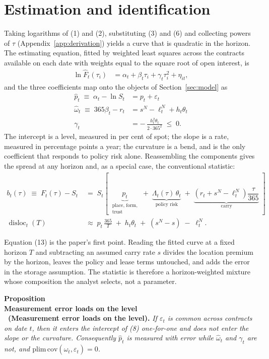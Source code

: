 \documentclass[11pt,a4paper]{article}
\newcounter{proposition}
\newenvironment{proposition}[1][]
  {\par\refstepcounter{proposition}\medskip\noindent
   \textbf{Proposition \theproposition\ifx\\#1\\\else\ (#1)\fi.}\itshape\space}
  {\upshape\par\medskip}
\newcommand{\sN}{s^{N}}
\newcommand{\lN}{\ell^{N}_{t}}
\newcommand{\Fhat}{\widehat{F}}
\newcommand{\disloc}{\operatorname{disloc}}
\begin{document}
\section{Estimation and identification}
\label{sec:ident}

Taking logarithms of (1) and (2), substituting (3) and (6) and collecting powers
of $\tau$ (Appendix~\ref{app:derivation}) yields a curve that is quadratic in
the horizon. The estimating equation, fitted by weighted least squares across
the contracts available on each date with weights equal to the square root of
open interest, is
\begin{align}
\ln \Fhat_t(\tau_i) &= \alpha_t+\beta_t\tau_i+\gamma_t\tau_i^{2}+\eta_{it},
\end{align}
and the three coefficients map onto the objects of Section~\ref{sec:model} as
\begin{align}
\hat{p}_t \;\equiv\; \alpha_t-\ln S_t &= p_t+\varepsilon_t \\[2pt]
\hat{\omega}_t \;\equiv\; 365\beta_t-r_t &= \sN-\lN+h_t\theta_t \\[2pt]
\gamma_t &= -\,\frac{h_t^{2}\theta_t}{2\cdot 365^{2}} \;\le\; 0 .
\end{align}
The intercept is a level, measured in per cent of spot; the slope is a rate,
measured in percentage points a year; the curvature is a bend, and is the only
coefficient that responds to policy risk alone. Reassembling the components
gives the spread at any horizon and, as a special case, the conventional
statistic:
\begin{align}
b_t(\tau)\;\equiv\;F_t(\tau)-S_t
  \;&=\; S_t\left[\;
  \underbrace{p_t}_{\substack{\text{place, form,}\\ \text{trust}}}
  \;+\;\underbrace{\Lambda_t(\tau)\,\theta_t}_{\text{policy risk}}
  \;+\;\underbrace{\left(r_t+\sN-\lN\right)\dfrac{\tau}{365}}_{\text{carry}}
  \;\right] \\[6pt]
\disloc_t(T) \;&\approx\; p_t\,\frac{365}{T}\;+\;h_t\theta_t\;+\;\left(\sN-s\right)\;-\;\lN .
\end{align}

Equation (13) is the paper's first point. Reading the fitted curve at a fixed
horizon $T$ and subtracting an assumed carry rate $s$ divides the location
premium by the horizon, leaves the policy and lease terms untouched, and adds
the error in the storage assumption. The statistic is therefore a
horizon-weighted mixture whose composition the analyst selects, not a
parameter.

\begin{proposition}[Measurement error loads on the level]
\label{prop:timing}
If $\varepsilon_t$ is common across contracts on date $t$, then it enters the
intercept of (8) one-for-one and does not enter the slope or the curvature.
Consequently $\hat{p}_t$ is measured with error while $\hat{\omega}_t$ and
$\gamma_t$ are not, and $\mathrm{plim}\,\mathrm{cov}(\hat{\omega}_t,
\varepsilon_t)=0$.
\end{proposition}
\end{document}
